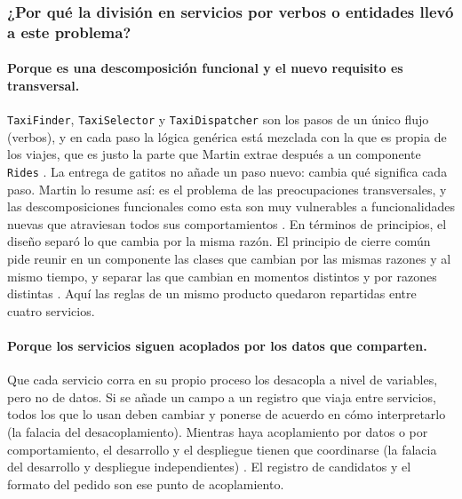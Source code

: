 \subsubsection{¿Por qué la división en servicios por verbos o entidades llevó a este problema?}

\paragraph{Porque es una descomposición funcional y el nuevo requisito es transversal.}
\texttt{TaxiFinder}, \texttt{TaxiSelector} y \texttt{TaxiDispatcher} son los pasos de un único flujo
(verbos), y en cada paso la lógica genérica está mezclada con la que es propia de los viajes, que es
justo la parte que Martin extrae después a un componente \texttt{Rides}
\parencite[p.~244]{martin2017clean}. La entrega de gatitos no añade un paso nuevo: cambia qué
significa cada paso. Martin lo resume así: es
el problema de las preocupaciones transversales, y las descomposiciones funcionales como esta son
muy vulnerables a funcionalidades nuevas que atraviesan todos sus comportamientos
\parencite[p.~243]{martin2017clean}. En términos de principios, el diseño separó lo que cambia por
la misma razón. El principio de cierre común pide reunir en un componente las clases que cambian por
las mismas razones y al mismo tiempo, y separar las que cambian en momentos distintos y por razones
distintas \parencite[p.~105]{martin2017clean}. Aquí las reglas de un mismo producto quedaron
repartidas entre cuatro servicios.

\paragraph{Porque los servicios siguen acoplados por los datos que comparten.} Que cada servicio corra
en su propio proceso los desacopla a nivel de variables, pero no de datos. Si se añade un campo a un
registro que viaja entre servicios, todos los que lo usan deben cambiar y ponerse de acuerdo en cómo
interpretarlo (la falacia del desacoplamiento). Mientras haya acoplamiento por datos o por
comportamiento, el desarrollo y el despliegue tienen que coordinarse (la falacia del desarrollo y
despliegue independientes) \parencite[pp.~240--241]{martin2017clean}. El registro de candidatos y el
formato del pedido son ese punto de acoplamiento.

